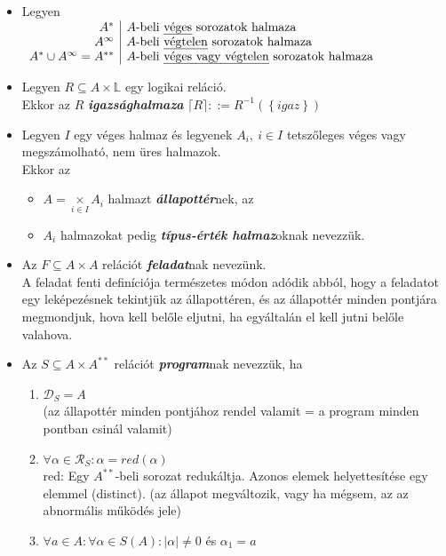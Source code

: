 \documentclass[12pt,margin=0px]{article}
\begin{document}
	\begin{itemize}
	
		\item	Legyen\\
          $\begin{array}{r|l}
            A^{*} & A\text{-beli \emph{véges} sorozatok halmaza} \\
            A^{\infty} & A\text{-beli \emph{végtelen} sorozatok halmaza} \\
            A^{*} \cup A^{\infty} = A^{**} & A\text{-beli \emph{véges vagy végtelen} sorozatok halmaza} \\
          \end{array}$

		\item	Legyen $R \subseteq A \times \mathbb{L}$ egy logikai reláció.\\
        Ekkor az $R$ \emph{\textbf{igazsághalmaza}}
		$\lceil R \rceil ::= R^{-1}(\left\{{igaz}\right\}) $
		
		\item	Legyen $I$ egy véges halmaz és legyenek $A_{i},\ i \in I$ tetszőleges véges vagy megszámolható, nem üres halmazok.\\
		Ekkor az
        \begin{itemize}
            \item $A = \underset{i \in I}{\times} A_{i}$ halmazt \emph{\textbf{állapottér}}nek, az
            \item $A_{i}$ halmazokat pedig \emph{\textbf{típus-érték halmaz}}oknak nevezzük.
		\end{itemize}
		\item	Az $F \subseteq A \times A$ relációt \emph{\textbf{feladat}}nak nevezünk.\\
        {\footnotesize A feladat fenti definíciója természetes módon adódik abból, hogy a feladatot egy leképezésnek tekintjük az állapottéren, és az állapottér minden pontjára megmondjuk, hova kell belőle eljutni, ha egyáltalán el kell jutni belőle valahova.}
		
		\item Az $S \subseteq A \times A^{**}$ relációt \emph{\textbf{program}}nak nevezzük, ha
			\begin{enumerate}
				\item	$\mathcal{D}_{S}=A$\\
                {\footnotesize (az állapottér minden pontjához rendel valamit = a program minden pontban csinál valamit)}
				\item	$\forall \alpha \in \mathcal{R}_{S} : \alpha = red(\alpha)$\\
                red: Egy $A^{**}$-beli sorozat redukáltja. Azonos elemek helyettesítése egy elemmel (distinct).
                {\footnotesize(az állapot megváltozik, vagy ha mégsem, az az abnormális működés jele)}
				\item	$\forall a \in A : \forall \alpha \in S(A) : |\alpha| \not = 0$ és $\alpha_{1}=a$\\
			\end{enumerate}
	\end{itemize}
\end{document}
